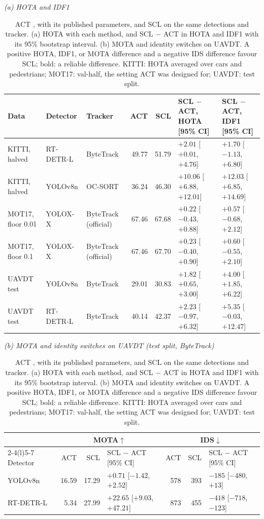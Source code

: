 \documentclass[pdflatex,sn-mathphys-num,iicol]{sn-jnl}
\newcommand{\scl}{SCL}
\begin{document}
\begin{table}[!tp]
\caption{ACT \cite{act2026adaptive}, with its published parameters, and \scl{} on the same detections and tracker. (a) HOTA with each method, and \scl{} $-$ ACT in HOTA and IDF1 with its 95\% bootstrap interval. (b) MOTA and identity switches on UAVDT. A positive HOTA, IDF1, or MOTA difference and a negative IDS difference favour \scl{}; bold: a reliable difference. KITTI: HOTA averaged over cars and pedestrians; MOT17: val-half, the setting ACT was designed for; UAVDT: test split.}
\label{tab:act}
\centering\footnotesize
\setlength{\tabcolsep}{3pt}
{\textit{(a) HOTA and IDF1}}\par\smallskip
\begin{tabular}{@{}lllrrll@{}}
\toprule
Data & Detector & Tracker & ACT & \scl{} & \scl{} $-$ ACT, HOTA [95\% CI] & \scl{} $-$ ACT, IDF1 [95\% CI]\\
\midrule
KITTI, halved & RT-DETR-L & ByteTrack & 49.77 & 51.79 & {\boldmath $+2.01$ [$+0.01$, $+4.76$]} & $+1.70$ [$-1.13$, $+6.80$]\\
KITTI, halved & YOLOv8n & OC-SORT & 36.24 & 46.30 & {\boldmath $+10.06$ [$+6.88$, $+12.01$]} & {\boldmath $+12.03$ [$+6.85$, $+14.69$]}\\
\addlinespace[2pt]
MOT17, floor 0.01 & YOLOX-X & ByteTrack (official) & 67.46 & 67.68 & $+0.22$ [$-0.43$, $+0.88$] & $+0.57$ [$-0.68$, $+2.12$]\\
MOT17, floor 0.1 & YOLOX-X & ByteTrack (official) & 67.46 & 67.70 & $+0.23$ [$-0.40$, $+0.90$] & $+0.60$ [$-0.55$, $+2.10$]\\
\addlinespace[2pt]
UAVDT test & YOLOv8n & ByteTrack & 29.01 & 30.83 & {\boldmath $+1.82$ [$+0.65$, $+3.00$]} & {\boldmath $+4.00$ [$+1.85$, $+6.22$]}\\
UAVDT test & RT-DETR-L & ByteTrack & 40.14 & 42.37 & $+2.23$ [$-0.97$, $+6.32$] & $+5.35$ [$-0.03$, $+12.47$]\\
\bottomrule
\end{tabular}

\medskip
{\textit{(b) MOTA and identity switches on UAVDT (test split, ByteTrack)}}\par\smallskip
\begin{tabular}{@{}lrrlrrl@{}}
\toprule
 & \multicolumn{3}{c}{MOTA$\uparrow$} & \multicolumn{3}{c}{IDS$\downarrow$}\\
\cmidrule(lr){2-4}\cmidrule(l){5-7}
Detector & ACT & \scl{} & \scl{} $-$ ACT [95\% CI] & ACT & \scl{} & \scl{} $-$ ACT [95\% CI]\\
\midrule
YOLOv8n & 16.59 & 17.29 & $+0.71$ [$-1.42$, $+2.52$] & 578 & 393 & $-185$ [$-480$, $+13$]\\
RT-DETR-L & 5.34 & 27.99 & {\boldmath $+22.65$ [$+9.03$, $+47.21$]} & 873 & 455 & {\boldmath $-418$ [$-718$, $-123$]}\\
\bottomrule
\end{tabular}
\end{table}
\end{document}
